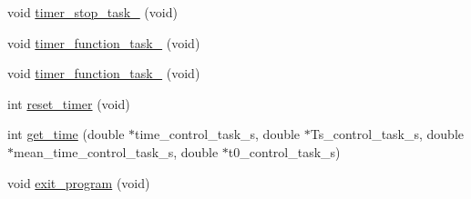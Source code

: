 \begin{DoxyCompactItemize}
\item 
void \hyperlink{main2_01_07C_xC3_xB3pia_01em_01conflito_01de_01Caio_01Gustavo_01Mesquita_01Angelo_012013-04-28_08_8c_a0c69dbcb7b2885a2de116b9d690280de}{timer\-\_\-stop\-\_\-task\-\_} (void)
\item 
void \hyperlink{main2_01_07C_xC3_xB3pia_01em_01conflito_01de_01Caio_01Gustavo_01Mesquita_01Angelo_012013-04-28_08_8c_a90885bae1b9535b16e014fb928e98e37}{timer\-\_\-function\-\_\-task\-\_} (void)
\item 
void \hyperlink{main2_01_07C_xC3_xB3pia_01em_01conflito_01de_01Caio_01Gustavo_01Mesquita_01Angelo_012013-04-28_08_8c_a01c18e97a4488be2912eb738b2e7f890}{timer\-\_\-function\-\_\-task\-\_} (void)
\item 
int \hyperlink{main2_01_07C_xC3_xB3pia_01em_01conflito_01de_01Caio_01Gustavo_01Mesquita_01Angelo_012013-04-28_08_8c_a97a188c3a74115770124cf0bf0c1e407}{reset\-\_\-timer} (void)
\item 
int \hyperlink{main2_01_07C_xC3_xB3pia_01em_01conflito_01de_01Caio_01Gustavo_01Mesquita_01Angelo_012013-04-28_08_8c_a5b2b1fdd5e517470c10e84a2b2bcc5c8}{get\-\_\-time} (double $\ast$time\-\_\-control\-\_\-task\-\_\-s, double $\ast$Ts\-\_\-control\-\_\-task\-\_\-s, double $\ast$mean\-\_\-time\-\_\-control\-\_\-task\-\_\-s, double $\ast$t0\-\_\-control\-\_\-task\-\_\-s)
\item 
void \hyperlink{main2_01_07C_xC3_xB3pia_01em_01conflito_01de_01Caio_01Gustavo_01Mesquita_01Angelo_012013-04-28_08_8c_a5f05ce725141ddfab683e059b1cd95ea}{exit\-\_\-program} (void)
\end{DoxyCompactItemize}
